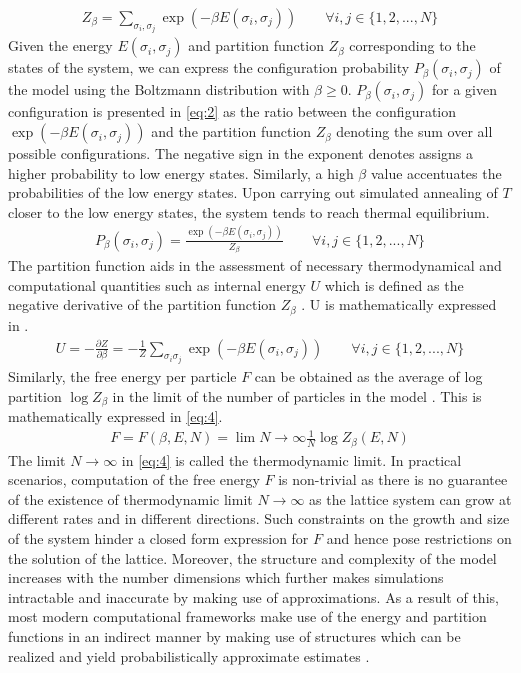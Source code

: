 \documentclass{article}
\begin{document}
\begin{gather}
    Z_{\beta} = \sum_{\sigma_{i},\sigma_{j}}\exp{(-\beta E(\sigma_{i},\sigma_{j}))} \qquad \forall i,j \in \{1,2,...,N\} \label{eq:1}
\end{gather}
Given the energy $E(\sigma_{i},\sigma_{j})$ and partition function $Z_{\beta}$ corresponding to the states of the system, we can express the configuration probability $P_{\beta}(\sigma_{i},\sigma_{j})$ of the model using the Boltzmann distribution \cite{book} with $\beta \geq 0$. $P_{\beta}(\sigma_{i},\sigma_{j})$ for a given configuration is presented in \autoref{eq:2} as the ratio between the configuration $\exp{(- \beta E(\sigma_{i},\sigma_{j}))}$ and the partition function $Z_{\beta}$ denoting the sum over all possible configurations. The negative sign in the exponent denotes assigns a higher probability to low energy states. Similarly, a high $\beta$ value accentuates the probabilities of the low energy states. Upon carrying out simulated annealing \cite{david} of $T$ closer to the low energy states, the system tends to reach thermal equilibrium. 
\begin{gather}
    P_{\beta}(\sigma_{i},\sigma_{j}) = \frac{\exp{(-\beta E(\sigma_{i},\sigma_{j}))}}{Z_{\beta}} \qquad \forall i,j \in \{1,2,...,N\} \label{eq:2}
\end{gather}
The partition function aids in the assessment of necessary thermodynamical and computational quantities such as internal energy $U$ which is defined as the negative derivative of the partition function $Z_{\beta}$ \cite{stats}. U is mathematically expressed in \label{eq:3}. 
\begin{gather}
    U = - \frac{\partial Z}{\partial \beta} = - \frac{1}{Z}\sum_{\sigma_{i}\sigma_{j}}\exp{(-\beta E(\sigma_{i},\sigma_{j}))} \qquad \forall i,j \in \{1,2,...,N\} \label{eq:3}
\end{gather}
Similarly, the free energy per particle $F$ can be obtained as the average of log partition $\log{Z_{\beta}}$ in the limit of the number of particles in the model \cite{thompson}. This is mathematically expressed in \autoref{eq:4}.
\begin{gather}
    F = F(\beta,E,N) = \lim{N \to \infty} \frac{1}{N} \log{Z_{\beta}(E,N)} \label{eq:4}
\end{gather}
The limit $N \to \infty$ in \autoref{eq:4} is called the thermodynamic limit. In practical scenarios, computation of the free energy $F$ is non-trivial as there is no guarantee of the existence of thermodynamic limit $N \to \infty$ as the lattice system can grow at different rates and in different directions. Such constraints on the growth and size of the system hinder a closed form expression for $F$ and hence pose restrictions on the solution of the lattice. Moreover, the structure and complexity of the model increases with the number dimensions \cite{exact} which further makes simulations intractable and inaccurate by making use of approximations. As a result of this, most modern computational frameworks \cite{transform} make use of the energy and partition functions in an indirect manner by making use of structures which can be realized and yield probabilistically approximate estimates \cite{overcomplete}. 
\end{document}
